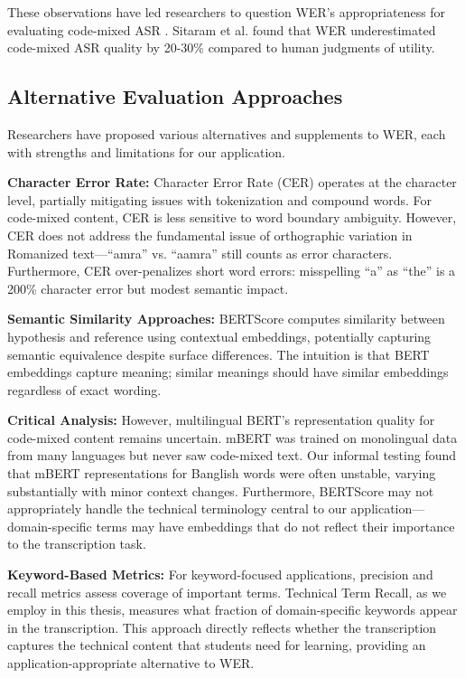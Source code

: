 These observations have led researchers to question WER's appropriateness for evaluating code-mixed ASR \cite{Sitaram2019}. Sitaram et al. found that WER underestimated code-mixed ASR quality by 20-30\% compared to human judgments of utility.

\subsection{Alternative Evaluation Approaches}

Researchers have proposed various alternatives and supplements to WER, each with strengths and limitations for our application.

\textbf{Character Error Rate:} Character Error Rate (CER) operates at the character level, partially mitigating issues with tokenization and compound words. For code-mixed content, CER is less sensitive to word boundary ambiguity. However, CER does not address the fundamental issue of orthographic variation in Romanized text---``amra'' vs. ``aamra'' still counts as error characters. Furthermore, CER over-penalizes short word errors: misspelling ``a'' as ``the'' is a 200\% character error but modest semantic impact.

\textbf{Semantic Similarity Approaches:} BERTScore \cite{Zhang2020BERTScore} computes similarity between hypothesis and reference using contextual embeddings, potentially capturing semantic equivalence despite surface differences. The intuition is that BERT embeddings capture meaning; similar meanings should have similar embeddings regardless of exact wording.

\textbf{Critical Analysis:} However, multilingual BERT's representation quality for code-mixed content remains uncertain. mBERT was trained on monolingual data from many languages but never saw code-mixed text. Our informal testing found that mBERT representations for Banglish words were often unstable, varying substantially with minor context changes. Furthermore, BERTScore may not appropriately handle the technical terminology central to our application---domain-specific terms may have embeddings that do not reflect their importance to the transcription task.

\textbf{Keyword-Based Metrics:} For keyword-focused applications, precision and recall metrics assess coverage of important terms. Technical Term Recall, as we employ in this thesis, measures what fraction of domain-specific keywords appear in the transcription. This approach directly reflects whether the transcription captures the technical content that students need for learning, providing an application-appropriate alternative to WER.

